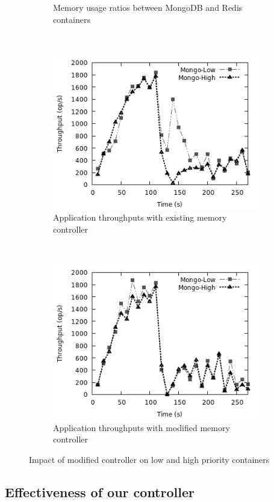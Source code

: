 \begin{figure}
\begin{subfigure}{0.30\textwidth}
	  \caption{\footnotesize Memory usage ratios between MongoDB and Redis containers}
	  \label{mem_sol_ratios}
	\end{subfigure}
	~
	\begin{subfigure}{0.5\textwidth}
	  \includegraphics[scale=0.6]{images/mem_sol/mongo_before.png}
	  \caption{\footnotesize Application throughputs with existing memory controller}
	  \label{throughput_mongo_before}
	\end{subfigure}
	~
	\begin{subfigure}{0.5\textwidth}
	  \includegraphics[scale=0.6]{images/mem_sol/mongo_after.png}
	  \caption{\footnotesize Application throughputs with modified memory controller}
	  \label{throughput_mongo_after}
	\end{subfigure}	
  \label{fig:mem_sol}
\caption{Impact of modified controller on low and high priority containers}
\end{figure}

  
    \subsection{Effectiveness of our controller}
    
